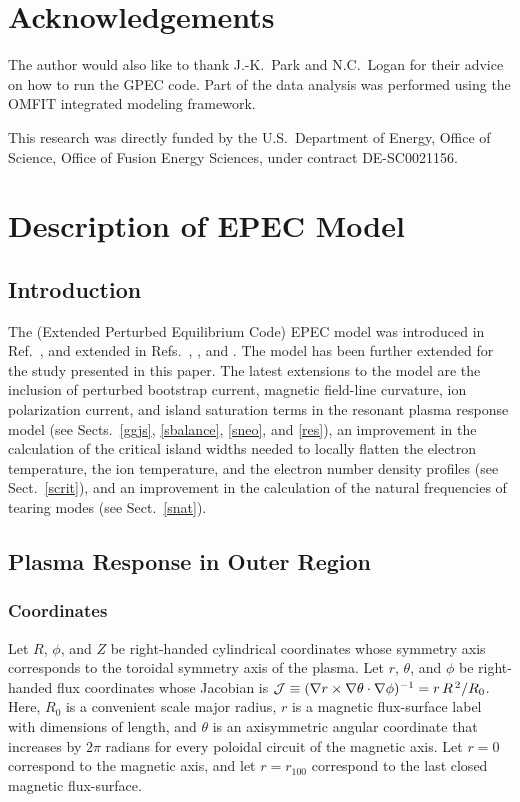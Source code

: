 \documentclass[12pt,prb,aps]{revtex4-1}
\begin{document}
\section*{Acknowledgements}
The author would also
like to thank J.-K.~Park and N.C.~Logan for their advice on how to run the GPEC code. Part of the data analysis was performed using
the OMFIT integrated modeling framework.\cite{omfit}

This research was directly funded by the U.S.\ Department of Energy, Office of Science, Office of Fusion Energy Sciences, under  contract DE-SC0021156. 

\appendix
\section{Description of EPEC Model}\label{epec}
\subsection{Introduction}
The (Extended Perturbed Equilibrium Code) EPEC model was introduced in Ref.~, and extended  in Refs.~, , and . The model has been further extended for the study
presented in this paper. 
The latest extensions to the model are the inclusion of  perturbed bootstrap current, magnetic field-line
curvature, ion polarization current, and island saturation terms in the resonant plasma response model (see Sects.~\ref{ggjs}, \ref{sbalance}, \ref{sneo}, and \ref{res}), an improvement in the calculation of the critical island widths needed to
locally flatten the electron temperature, the ion temperature, and the electron number density profiles (see Sect.~\ref{scrit}), 
and an improvement in the calculation of the natural frequencies of tearing modes (see Sect.~\ref{snat}). 

\subsection{Plasma Response in Outer Region}
\subsubsection{Coordinates}\label{a1}
Let $R$, $\phi$, and $Z$ be right-handed cylindrical coordinates whose symmetry axis corresponds to
the toroidal symmetry axis of the plasma. Let $r$, $\theta$, and $\phi$ be right-handed flux coordinates
whose Jacobian is ${\cal J}\equiv (\nabla r \times \nabla\theta\cdot\nabla\phi)^{-1}=r\,R^{\,2}/R_0$. 
Here, $R_0$ is a convenient scale major radius, $r$ is a magnetic flux-surface label with dimensions of length,
and $\theta$ is an axisymmetric angular coordinate that increases by $2\pi$ radians for every poloidal circuit of the magnetic axis.
Let $r=0$ correspond to the magnetic axis, and let $r=r_{100}$ correspond to the last closed magnetic flux-surface. 
\end{document}
